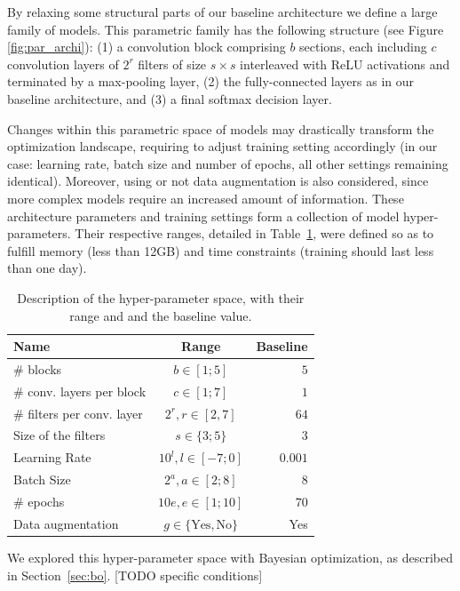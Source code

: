 By relaxing some structural parts of our baseline architecture we define a large family of models. This parametric family has the following structure (see Figure \ref{fig:par_archi}): (1) a convolution block comprising $b$ sections, each including $c$ convolution layers of $2^r$ filters of size $s \times s$ interleaved with ReLU activations and terminated by a max-pooling layer, (2) the fully-connected layers as in our baseline architecture, and (3) a final softmax decision layer. 

Changes within this parametric space of models may drastically transform the optimization landscape, requiring to adjust training setting accordingly (in our case: learning rate, batch size and number of epochs, all other settings remaining identical). Moreover, using or not data augmentation is also considered, since more complex models require an increased amount of information.
These architecture parameters and training settings form a collection of model hyper-parameters. Their respective ranges, detailed in Table~\ref{table:hyper}, were defined so as to fulfill memory (less than 12GB) and time constraints (training should last less than one day).

\begin{table}
	\centering
	\begin{tabular}{ | l | c | r | }
		\hline
		Name & Range & Baseline \\ \hline
		\# blocks & $b \in [1 ; 5]$ & $5$ \\
		\# conv. layers per block & $c \in [1 ; 7]$ & $1$ \\
		\# filters per conv. layer & $2^{r}, r \in [2, 7]$ & $64$ \\
		Size of the filters & $ s \in \{3 ; 5\}$ & $3$ \\
		Learning Rate & $10^{l}, l \in [-7 ; 0]$ & $0.001$ \\
		Batch Size & $2^{a}, a \in [2 ; 8]$ & 8 \\
		\# epochs & $10e, e \in [1 ; 10]$ & $70$ \\
        Data augmentation & $g \in \{\text{Yes}, \text{No}\}$ & Yes \\
		\hline
	\end{tabular}
	\caption{Description of the hyper-parameter space, with their range and and the baseline value.}
	\label{table:hyper}
\end{table}

We explored this hyper-parameter space with Bayesian optimization, as described in Section~\ref{sec:bo}. [TODO specific conditions]

